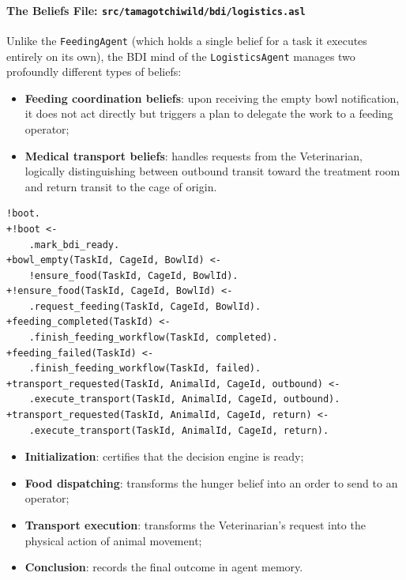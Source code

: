 \documentclass{article}
\renewcommand{\_}{\oldtextunderscore\allowbreak}
\begin{document}
\paragraph{The Beliefs File: \texttt{src/tamagotchi\_wild/bdi/logistics.asl}}
Unlike the \texttt{FeedingAgent} (which holds a single belief for a task it executes entirely on its own), the BDI mind of the \texttt{LogisticsAgent} manages two profoundly different types of beliefs:
\begin{itemize}
    \item \textbf{Feeding coordination beliefs}: upon receiving the empty bowl notification, it does not act directly but triggers a plan to delegate the work to a feeding operator;
    \item \textbf{Medical transport beliefs}: handles requests from the Veterinarian, logically distinguishing between outbound transit toward the treatment room and return transit to the cage of origin.
\end{itemize}
\begin{lstlisting}
!boot.
+!boot <-
    .mark_bdi_ready.
+bowl_empty(TaskId, CageId, BowlId) <-
    !ensure_food(TaskId, CageId, BowlId).
+!ensure_food(TaskId, CageId, BowlId) <-
    .request_feeding(TaskId, CageId, BowlId).
+feeding_completed(TaskId) <-
    .finish_feeding_workflow(TaskId, completed).
+feeding_failed(TaskId) <-
    .finish_feeding_workflow(TaskId, failed).
+transport_requested(TaskId, AnimalId, CageId, outbound) <-
    .execute_transport(TaskId, AnimalId, CageId, outbound).
+transport_requested(TaskId, AnimalId, CageId, return) <-
    .execute_transport(TaskId, AnimalId, CageId, return).
\end{lstlisting}
\begin{itemize}
    \item \textbf{Initialization}: certifies that the decision engine is ready;
    \item \textbf{Food dispatching}: transforms the hunger belief into an order to send to an operator;
    \item \textbf{Transport execution}: transforms the Veterinarian's request into the physical action of animal movement;
    \item \textbf{Conclusion}: records the final outcome in agent memory.
\end{itemize}
\end{document}
